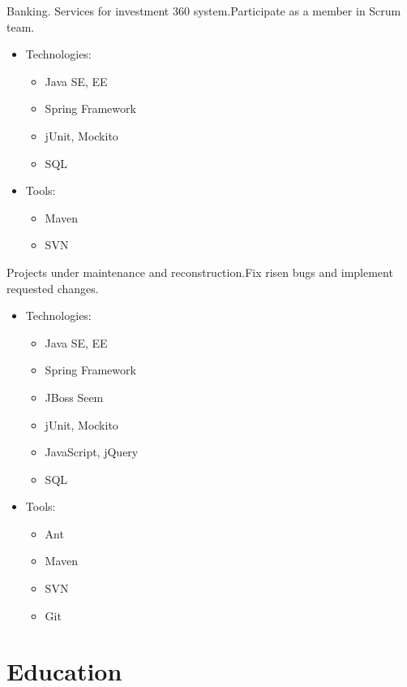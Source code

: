 \documentclass[11pt, a4paper]{moderncv}
\begin{document}
{Banking. Services for investment 360 system.\newline{}Participate as a member in Scrum team.
\begin{itemize}
\item Technologies:
\begin{itemize}
\item Java SE, EE
\item Spring Framework
\item jUnit, Mockito
\item SQL
\end{itemize}
\item Tools:
\begin{itemize}
\item Maven
\item SVN
\end{itemize}
\end{itemize}}

{Projects under maintenance and reconstruction.\newline{}Fix risen bugs and implement requested changes.
\begin{itemize}
\item Technologies:
\begin{itemize}
\item Java SE, EE
\item Spring Framework
\item JBoss Seem
\item jUnit, Mockito
\item JavaScript, jQuery
\item SQL
\end{itemize}
\item Tools:
\begin{itemize}
\item Ant
\item Maven
\item SVN
\item Git
\end{itemize}
\end{itemize}}


\section{Education}
{}
{}
\end{document}
